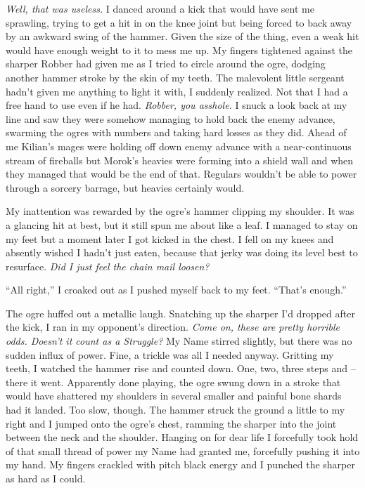 \documentclass[12pt, openany]{book}
\begin{document}
\textit{Well, that was useless.} I danced around a kick that would have sent me sprawling, trying to get a hit in on the knee joint but being forced to back away by an awkward swing of the hammer. Given the size of the thing, even a weak hit would have enough weight to it to mess me up. My fingers tightened against the sharper Robber had given me as I tried to circle around the ogre, dodging another hammer stroke by the skin of my teeth. The malevolent little sergeant hadn’t given me anything to light it with, I suddenly realized. Not that I had a free hand to use even if he had. \textit{Robber, you asshole.} I snuck a look back at my line and saw they were somehow managing to hold back the enemy advance, swarming the ogres with numbers and taking hard losses as they did. Ahead of me Kilian’s mages were holding off down enemy advance with a near-continuous stream of fireballs but Morok’s heavies were forming into a shield wall and when they managed that would be the end of that. Regulars wouldn’t be able to power through a sorcery barrage, but heavies certainly would.

My inattention was rewarded by the ogre’s hammer clipping my shoulder. It was a glancing hit at best, but it still spun me about like a leaf. I managed to stay on my feet but a moment later I got kicked in the chest. I fell on my knees and absently wished I hadn’t just eaten, because that jerky was doing its level best to resurface. \textit{Did I just feel the chain mail loosen?}

“All right,” I croaked out as I pushed myself back to my feet. “That’s enough.”

The ogre huffed out a metallic laugh. Snatching up the sharper I’d dropped after the kick, I ran in my opponent’s direction. \textit{Come on, these are pretty horrible odds. Doesn’t it count as a Struggle?} My Name stirred slightly, but there was no sudden influx of power. Fine, a trickle was all I needed anyway. Gritting my teeth, I watched the hammer rise and counted down. One, two, three steps and – there it went. Apparently done playing, the ogre swung down in a stroke that would have shattered my shoulders in several smaller and painful bone shards had it landed. Too slow, though. The hammer struck the ground a little to my right and I jumped onto the ogre’s chest, ramming the sharper into the joint between the neck and the shoulder. Hanging on for dear life I forcefully took hold of that small thread of power my Name had granted me, forcefully pushing it into my hand. My fingers crackled with pitch black energy and I punched the sharper as hard as I could.
\end{document}

